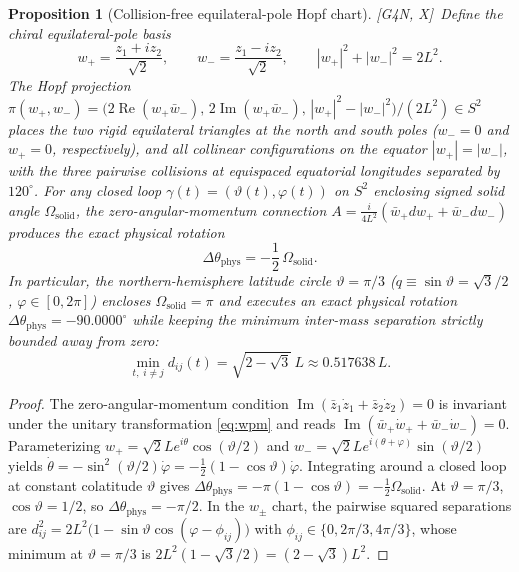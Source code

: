 \documentclass[11pt]{amsart}
\numberwithin{equation}{section}
\theoremstyle{plain}
\newtheorem{proposition}[theorem]{Proposition}
\theoremstyle{definition}\newtheorem{definition}[theorem]{Definition}
\theoremstyle{remark}\newtheorem{remark}[theorem]{Remark}
\newcommand{\ctag}[1]{\textup{\textsf{\scriptsize[#1]}}}
\begin{document}
\begin{proposition}[Collision-free equilateral-pole Hopf chart]\label{prop:hopf}
\ctag{G4N, X}\ Define the chiral equilateral-pole basis
\begin{equation}\label{eq:wpm}
w_+ = \frac{z_1 + i z_2}{\sqrt{2}}, \qquad w_- = \frac{z_1 - i z_2}{\sqrt{2}}, \qquad |w_+|^2 + |w_-|^2 = 2 L^2.
\end{equation}
The Hopf projection $\pi(w_+, w_-) = \bigl(2\operatorname{Re}(w_+ \bar{w}_-),\, 2\operatorname{Im}(w_+ \bar{w}_-),\, |w_+|^2 - |w_-|^2\bigr) / (2L^2) \in S^2$ places the two rigid equilateral triangles at the north and south poles ($w_- = 0$ and $w_+ = 0$, respectively), and all collinear configurations on the equator $|w_+| = |w_-|$, with the three pairwise collisions at equispaced equatorial longitudes separated by $120^\circ$.
For any closed loop $\gamma(t) = (\vartheta(t), \varphi(t))$ on $S^2$ enclosing signed solid angle $\Omega_{\mathrm{solid}}$, the zero-angular-momentum connection $A = \frac{i}{4L^2}(\bar{w}_+ dw_+ + \bar{w}_- dw_-)$ produces the exact physical rotation
\begin{equation}\label{eq:holonomy}
\Delta \theta_{\mathrm{phys}} = -\frac{1}{2}\,\Omega_{\mathrm{solid}}.
\end{equation}
In particular, the northern-hemisphere latitude circle $\vartheta = \pi/3$ ($q \equiv \sin\vartheta = \sqrt{3}/2$, $\varphi \in [0, 2\pi]$) encloses $\Omega_{\mathrm{solid}} = \pi$ and executes an exact physical rotation $\Delta\theta_{\mathrm{phys}} = -90.0000^\circ$ while keeping the minimum inter-mass separation strictly bounded away from zero:
\begin{equation}\label{eq:minsep}
\min_{t,\; i \neq j} d_{ij}(t) = \sqrt{2 - \sqrt{3}}\,L \approx 0.517638\,L.
\end{equation}
\end{proposition}
\begin{proof}
The zero-angular-momentum condition $\operatorname{Im}(\bar{z}_1 \dot{z}_1 + \bar{z}_2 \dot{z}_2) = 0$ is invariant under the unitary transformation \eqref{eq:wpm} and reads $\operatorname{Im}(\bar{w}_+ \dot{w}_+ + \bar{w}_- \dot{w}_-) = 0$. Parameterizing $w_+ = \sqrt{2} L e^{i\theta}\cos(\vartheta/2)$ and $w_- = \sqrt{2} L e^{i(\theta + \varphi)}\sin(\vartheta/2)$ yields $\dot{\theta} = -\sin^2(\vartheta/2)\dot{\varphi} = -\frac12(1-\cos\vartheta)\dot{\varphi}$. Integrating around a closed loop at constant colatitude $\vartheta$ gives $\Delta\theta_{\mathrm{phys}} = -\pi(1-\cos\vartheta) = -\frac12 \Omega_{\mathrm{solid}}$. At $\vartheta = \pi/3$, $\cos\vartheta = 1/2$, so $\Delta\theta_{\mathrm{phys}} = -\pi/2$. In the $w_\pm$ chart, the pairwise squared separations are $d_{ij}^2 = 2 L^2 \bigl(1 - \sin\vartheta \cos(\varphi - \phi_{ij})\bigr)$ with $\phi_{ij} \in \{0, 2\pi/3, 4\pi/3\}$, whose minimum at $\vartheta = \pi/3$ is $2L^2(1 - \sqrt{3}/2) = (2-\sqrt{3})L^2$.
\end{proof}
\end{document}
